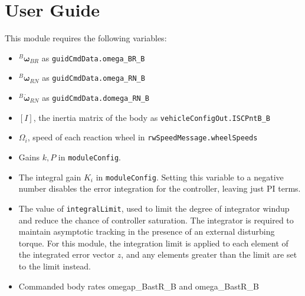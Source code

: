 \documentclass[]{BasiliskReportMemo}
\begin{document}
\section{User Guide}
This module requires the following variables:
\begin{itemize}
\item $^B\mathbf{\omega}_{BR}$  as \verb|guidCmdData.omega_BR_B|
\item $^B\mathbf{\omega}_{RN}$ as \verb|guidCmdData.omega_RN_B|
\item $^B\dot{\mathbf{\omega}}_{RN}$ as \verb|guidCmdData.domega_RN_B|
\item $[I]$, the inertia matrix of the body as \verb|vehicleConfigOut.ISCPntB_B|
\item $\Omega_i$, speed of each reaction wheel in \verb|rwSpeedMessage.wheelSpeeds|
\item Gains $k,P$ in \verb|moduleConfig|.
\item The integral gain $K_i$ in \verb|moduleConfig|. Setting this variable to a negative number disables the error integration for the controller, leaving just PI terms.
\item The value of \verb|integralLimit|, used to limit the degree of integrator windup and reduce the chance of controller saturation. The integrator is required to maintain asymptotic tracking in the presence of an external disturbing torque. For this module, the integration limit is applied to each element of the integrated error vector $z$, and any elements greater than the limit are set to the limit instead.
\item Commanded body rates omegap\_BastR\_B and omega\_BastR\_B

\end{itemize}



\end{document}
